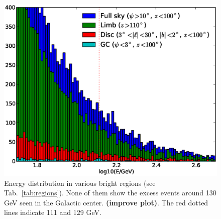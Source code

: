 \documentclass[aps,twocolumn,prd,superscriptaddress,showpacs,nofootinbib,fixfloat]{revtex4}
\begin{document}
\begin{figure}
  \centering
  \includegraphics[width=1.0\linewidth]{plots/target_spectra.eps}
  \caption{Energy distribution in various bright regions (see
  Tab.~\ref{tab:regions}).  None of them show the excess events around 130 GeV
  seen in the Galactic center.  \textbf{(improve plot)}. The red dotted lines
  indicate 111 and 129 GeV.}
  \label{fig:target_spectra}
\end{figure}
\end{document}
